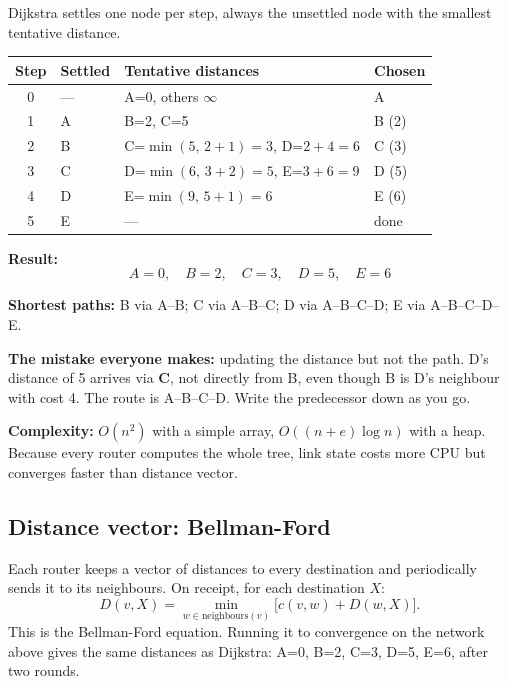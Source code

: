 \documentclass[11pt,a4paper]{article}
\begin{document}
\begin{solbox}
Dijkstra settles one node per step, always the unsettled node with the smallest tentative distance.

\begin{center}\small
\begin{tabular}{c l l l}
\toprule Step & Settled & Tentative distances & Chosen\\
\midrule
0 & --- & A=0, others $\infty$ & A\\
1 & A & B=2, C=5 & B (2)\\
2 & B & C=$\min(5,\,2+1)=3$, D=$2+4=6$ & C (3)\\
3 & C & D=$\min(6,\,3+2)=5$, E=$3+6=9$ & D (5)\\
4 & D & E=$\min(9,\,5+1)=6$ & E (6)\\
5 & E & --- & done\\
\bottomrule
\end{tabular}
\end{center}

\textbf{Result:}
\[
A=0,\quad B=2,\quad C=3,\quad D=5,\quad E=6
\]

\textbf{Shortest paths:} B via A--B; C via A--B--C; D via A--B--C--D; E via A--B--C--D--E.

\begin{dangerbox}
\textbf{The mistake everyone makes:} updating the distance but not the path. D's distance of 5 arrives via \textbf{C}, not directly from B, even though B is D's neighbour with cost 4. The route is A--B--C--D. Write the predecessor down as you go.
\end{dangerbox}

\textbf{Complexity:} $O(n^2)$ with a simple array, $O((n+e)\log n)$ with a heap. Because every router computes the whole tree, link state costs more CPU but converges faster than distance vector.
\end{solbox}

\subsection{Distance vector: Bellman-Ford}

Each router keeps a vector of distances to every destination and periodically sends it to its neighbours. On receipt, for each destination $X$:
\[
D(v, X) = \min_{w \in \text{neighbours}(v)} \big[ c(v,w) + D(w, X) \big].
\]
This is the Bellman-Ford equation. Running it to convergence on the network above gives the same distances as Dijkstra: A=0, B=2, C=3, D=5, E=6, after two rounds.
\end{document}
